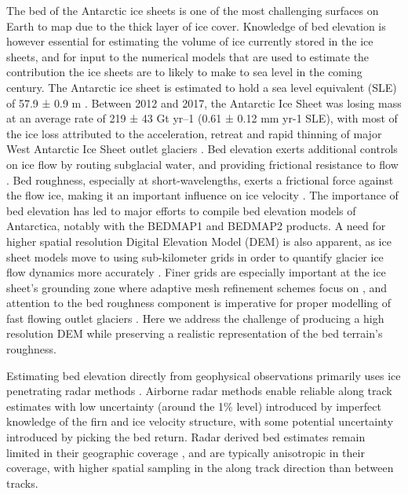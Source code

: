 \documentclass[tc, manuscript]{copernicus}
\begin{document}
The bed of the Antarctic ice sheets is one of the most challenging surfaces on Earth to map due to the thick layer of ice cover.
Knowledge of bed elevation is however essential for estimating the volume of ice currently stored in the ice sheets, and for input to the numerical models that are used to estimate the contribution the ice sheets are to likely to make to sea level in the coming century.
The Antarctic ice sheet is estimated to hold a sea level equivalent (SLE) of 57.9 ± 0.9 m \citep{MorlighemDeepglacialtroughs2019}.
Between 2012 and 2017, the Antarctic Ice Sheet was losing mass at an average rate of 219 ± 43 Gt yr–1 (0.61 ± 0.12 mm yr-1 SLE), with most of the ice loss attributed to the acceleration, retreat and rapid thinning of major West Antarctic Ice Sheet outlet glaciers \citep{TheIMBIEteamMassbalanceAntarctic2018}.
Bed elevation exerts additional controls on ice flow by routing subglacial water, and providing frictional resistance to flow \citep{SiegertMacroscalebedroughness2004}.
Bed roughness, especially at short-wavelengths, exerts a frictional force against the flow ice, making it an important influence on ice velocity \citep{BinghamDiverselandscapesPine2017,FalciniQuantifyingbedroughness2018}.
The importance of bed elevation has led to major efforts to compile bed elevation models of Antarctica, notably with the BEDMAP1 \citep{LytheBEDMAPnewice2001} and BEDMAP2 \citep{FretwellBedmap2improvedice2013} products.
A need for higher spatial resolution Digital Elevation Model (DEM) is also apparent, as ice sheet models move to using sub-kilometer grids in order to quantify glacier ice flow dynamics more accurately \citep{Grahamhighresolutionsyntheticbed2017}.
Finer grids are especially important at the ice sheet's grounding zone where adaptive mesh refinement schemes focus on \citep[e.g.][]{CornfordAdaptivemeshrefinement2016}, and attention to the bed roughness component is imperative for proper modelling of fast flowing outlet glaciers \citep{DurandImpactbedrockdescription2011,NiasContrastingmodelledsensitivity2016}.
Here we address the challenge of producing a high resolution DEM while preserving a realistic representation of the bed terrain's roughness.

Estimating bed elevation directly from geophysical observations primarily uses ice penetrating radar methods \citep[e.g.][]{RobinRadioechoexploration1970}.
Airborne radar methods enable reliable along track estimates with low uncertainty (around the 1\% level) introduced by imperfect knowledge of the firn and ice velocity structure, with some potential uncertainty introduced by picking the bed return.
Radar derived bed estimates remain limited in their geographic coverage \citep{FretwellBedmap2improvedice2013}, and are typically anisotropic in their coverage, with higher spatial sampling in the along track direction than between tracks.
\end{document}
